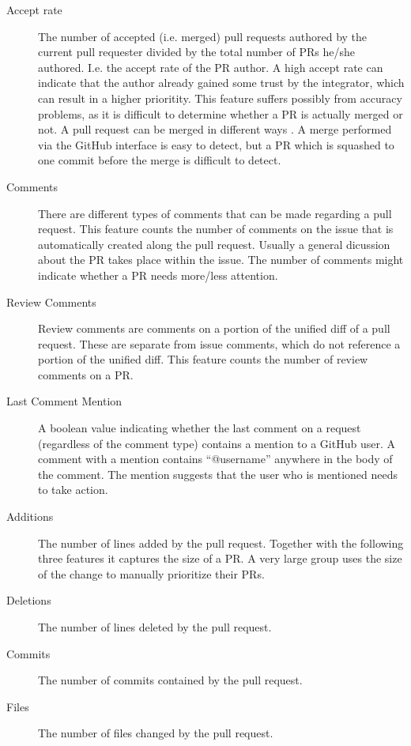 \begin{description}
\item[Accept rate]
The number of accepted (i.e. merged) pull requests authored by the current pull requester divided by the total number of PRs he/she authored.
I.e. the accept rate of the PR author.
A high accept rate can indicate that the author already gained some trust by the integrator, which can result in a higher prioritity.
This feature suffers possibly from accuracy problems, as it is difficult to determine whether a PR is actually merged or not.
A pull request can be merged in different ways \cite{GPD14}.
A merge performed via the GitHub interface is easy to detect, but a PR which is squashed to one commit before the merge is difficult to detect.

\item[Comments]
There are different types of comments that can be made regarding a pull request.
This feature counts the number of comments on the issue that is automatically created along the pull request.
Usually a general dicussion about the PR takes place within the issue.
The number of comments might indicate whether a PR needs more/less attention.

\item[Review Comments]
Review comments are comments on a portion of the unified diff of a pull request.
These are separate from issue comments, which do not reference a portion of the unified diff.
This feature counts the number of review comments on a PR.

\item[Last Comment Mention]
A boolean value indicating whether the last comment on a request (regardless of the comment type) contains a mention to a GitHub user.
A comment with a mention contains ``@username'' anywhere in the body of the comment.
The mention suggests that the user who is mentioned needs to take action.

\item[Additions]
The number of lines added by the pull request.
Together with the following three features it captures the size of a PR.
A very large group uses the size of the change to manually prioritize their PRs.

\item[Deletions]
The number of lines deleted by the pull request.

\item[Commits]
The number of commits contained by the pull request.

\item[Files]
The number of files changed by the pull request.


\end{description}
